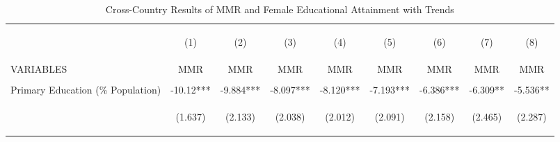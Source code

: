 \begin{landscape}\begin{table}[htpb!]\begin{center}\caption{Cross-Country Results of MMR and Female Educational Attainment with Trends}\label{MMRtab:MMRpercentTrends}\begin{tabular}{lcccccccc}\toprule&\begin{footnotesize}(1)\end{footnotesize}&\begin{footnotesize}(2)\end{footnotesize}&\begin{footnotesize}(3)\end{footnotesize}&\begin{footnotesize}(4)\end{footnotesize}&\begin{footnotesize}(5)\end{footnotesize}&\begin{footnotesize}(6)\end{footnotesize}&\begin{footnotesize}(7)\end{footnotesize}&\begin{footnotesize}(8) \end{footnotesize}\\
VARIABLES&MMR&MMR&MMR&MMR&MMR&MMR&MMR&MMR\\ \midrule
&&&&&&&&\\
Primary Education (\% Population) &-10.12***&-9.884***&-8.097***&-8.120***&-7.193***&-6.386***&-6.309**&-5.536**\\
&\begin{footnotesize}(1.637)\end{footnotesize}&\begin{footnotesize}(2.133)\end{footnotesize}&\begin{footnotesize}(2.038)\end{footnotesize}&\begin{footnotesize}(2.012)\end{footnotesize}&\begin{footnotesize}(2.091)\end{footnotesize}&\begin{footnotesize}(2.158)\end{footnotesize}&\begin{footnotesize}(2.465)\end{footnotesize}&\begin{footnotesize}(2.287)\end{footnotesize}\\

\end{tabular}
\end{center}
\end{table}
\end{landscape}
